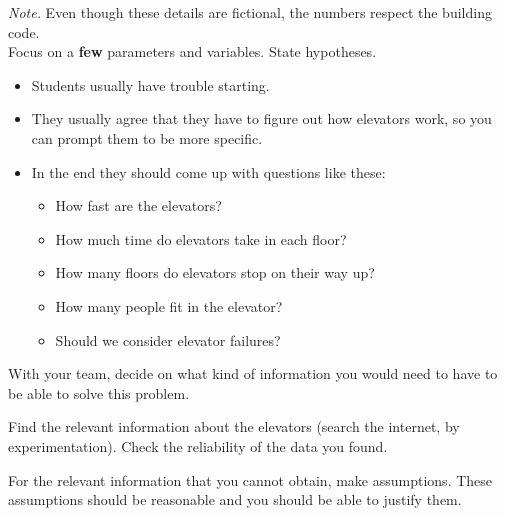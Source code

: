 \textsl{Note.} Even though these details are fictional, the numbers respect the building code. \\

Focus on a \textbf{few} parameters and variables. State hypotheses.


\begin{annotation}
	\begin{notes}
		\begin{itemize}
			\item Students usually have trouble starting. 
			\item They usually agree that they have to figure out how elevators work, so you can prompt them to be more specific. 
			
			\item In the end they should come up with questions like these:
			\begin{itemize}
				\item How fast are the elevators?
				\item How much time do elevators take in each floor?
				\item How many floors do elevators stop on their way up?
				\item How many people fit in the elevator?
				\item Should we consider elevator failures?
			\end{itemize}
		\end{itemize}	
	\end{notes}
\end{annotation}

\bookonlynewpage

\question

\begin{parts} 

	\item With your team, decide on what kind of information you would need to have to be able to solve this problem.

	\item Find the relevant information about the elevators (search the internet, by experimentation). Check the reliability of the data you found.

	\item For the relevant information that you cannot obtain, make assumptions. These assumptions should be reasonable and you should be able to justify them.
\end{parts}



















